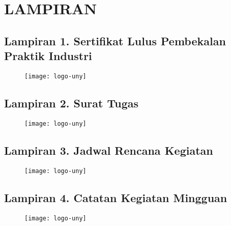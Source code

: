 
\appendix
\chapter*{LAMPIRAN}

\section*{Lampiran 1. Sertifikat Lulus Pembekalan Praktik Industri}
\begin{figure}[H]
	\centering
	\texttt{[image: logo-uny]}
\end{figure}

\newpage

\section*{Lampiran 2. Surat Tugas \tipe}
\begin{figure}[H]
	\centering
	\texttt{[image: logo-uny]}
\end{figure}

\newpage

\section*{Lampiran 3. Jadwal Rencana Kegiatan \tipe}
\begin{figure}[H]
	\centering
	\texttt{[image: logo-uny]}
\end{figure}

\newpage

\section*{Lampiran 4. Catatan Kegiatan Mingguan}
\begin{figure}[H]
	\centering
	\texttt{[image: logo-uny]}
\end{figure}

